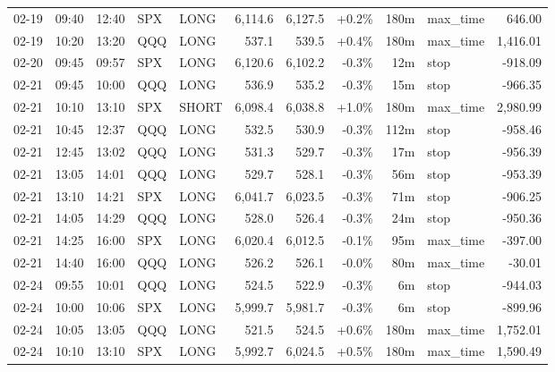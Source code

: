 \documentclass[11pt,a4paper,twoside]{article}
\begin{document}
\begin{center}
\begin{longtable}{>{\color{txtmain}}l l l l l r r r r >{\color{txtmain}}l r}
02-19 & 09:40 & 12:40 & SPX & LONG & 6,114.6 & 6,127.5 & \textcolor{wingreen}{+0.2\%} & 180m & max\_time & \textcolor{wingreen}{646.00} \\
02-19 & 10:20 & 13:20 & QQQ & LONG & 537.1 & 539.5 & \textcolor{wingreen}{+0.4\%} & 180m & max\_time & \textcolor{wingreen}{1,416.01} \\
02-20 & 09:45 & 09:57 & SPX & LONG & 6,120.6 & 6,102.2 & \textcolor{lossred}{-0.3\%} & 12m & stop & \textcolor{lossred}{-918.09} \\
02-21 & 09:45 & 10:00 & QQQ & LONG & 536.9 & 535.2 & \textcolor{lossred}{-0.3\%} & 15m & stop & \textcolor{lossred}{-966.35} \\
02-21 & 10:10 & 13:10 & SPX & SHORT & 6,098.4 & 6,038.8 & \textcolor{wingreen}{+1.0\%} & 180m & max\_time & \textcolor{wingreen}{2,980.99} \\
02-21 & 10:45 & 12:37 & QQQ & LONG & 532.5 & 530.9 & \textcolor{lossred}{-0.3\%} & 112m & stop & \textcolor{lossred}{-958.46} \\
02-21 & 12:45 & 13:02 & QQQ & LONG & 531.3 & 529.7 & \textcolor{lossred}{-0.3\%} & 17m & stop & \textcolor{lossred}{-956.39} \\
02-21 & 13:05 & 14:01 & QQQ & LONG & 529.7 & 528.1 & \textcolor{lossred}{-0.3\%} & 56m & stop & \textcolor{lossred}{-953.39} \\
02-21 & 13:10 & 14:21 & SPX & LONG & 6,041.7 & 6,023.5 & \textcolor{lossred}{-0.3\%} & 71m & stop & \textcolor{lossred}{-906.25} \\
02-21 & 14:05 & 14:29 & QQQ & LONG & 528.0 & 526.4 & \textcolor{lossred}{-0.3\%} & 24m & stop & \textcolor{lossred}{-950.36} \\
02-21 & 14:25 & 16:00 & SPX & LONG & 6,020.4 & 6,012.5 & \textcolor{lossred}{-0.1\%} & 95m & max\_time & \textcolor{lossred}{-397.00} \\
02-21 & 14:40 & 16:00 & QQQ & LONG & 526.2 & 526.1 & \textcolor{lossred}{-0.0\%} & 80m & max\_time & \textcolor{lossred}{-30.01} \\
02-24 & 09:55 & 10:01 & QQQ & LONG & 524.5 & 522.9 & \textcolor{lossred}{-0.3\%} & 6m & stop & \textcolor{lossred}{-944.03} \\
02-24 & 10:00 & 10:06 & SPX & LONG & 5,999.7 & 5,981.7 & \textcolor{lossred}{-0.3\%} & 6m & stop & \textcolor{lossred}{-899.96} \\
02-24 & 10:05 & 13:05 & QQQ & LONG & 521.5 & 524.5 & \textcolor{wingreen}{+0.6\%} & 180m & max\_time & \textcolor{wingreen}{1,752.01} \\
02-24 & 10:10 & 13:10 & SPX & LONG & 5,992.7 & 6,024.5 & \textcolor{wingreen}{+0.5\%} & 180m & max\_time & \textcolor{wingreen}{1,590.49} \\

\end{longtable}
\end{center}
\end{document}
